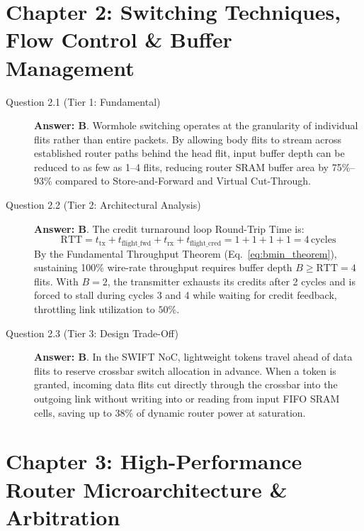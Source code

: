 \section*{Chapter 2: Switching Techniques, Flow Control \& Buffer Management}

\begin{description}
    \item[Question 2.1 (Tier 1: Fundamental)] \textbf{Answer: B}.
    Wormhole switching operates at the granularity of individual flits rather than entire packets. By allowing body flits to stream across established router paths behind the head flit, input buffer depth can be reduced to as few as 1--4 flits, reducing router SRAM buffer area by 75\%--93\% compared to Store-and-Forward and Virtual Cut-Through.

    \item[Question 2.2 (Tier 2: Architectural Analysis)] \textbf{Answer: B}.
    The credit turnaround loop Round-Trip Time is:
    \begin{equation*}
    \mathrm{RTT} = t_{\mathrm{tx}} + t_{\mathrm{flight\_fwd}} + t_{\mathrm{rx}} + t_{\mathrm{flight\_cred}} = 1 + 1 + 1 + 1 = 4\,\mathrm{cycles}
    \end{equation*}
    By the Fundamental Throughput Theorem (Eq.~\ref{eq:bmin_theorem}), sustaining 100\% wire-rate throughput requires buffer depth $B \ge \mathrm{RTT} = 4$ flits. With $B = 2$, the transmitter exhausts its credits after 2 cycles and is forced to stall during cycles 3 and 4 while waiting for credit feedback, throttling link utilization to $50\%$.

    \item[Question 2.3 (Tier 3: Design Trade-Off)] \textbf{Answer: B}.
    In the SWIFT NoC, lightweight tokens travel ahead of data flits to reserve crossbar switch allocation in advance. When a token is granted, incoming data flits cut directly through the crossbar into the outgoing link without writing into or reading from input FIFO SRAM cells, saving up to 38\% of dynamic router power at saturation.
\end{description}

\section*{Chapter 3: High-Performance Router Microarchitecture \& Arbitration}

